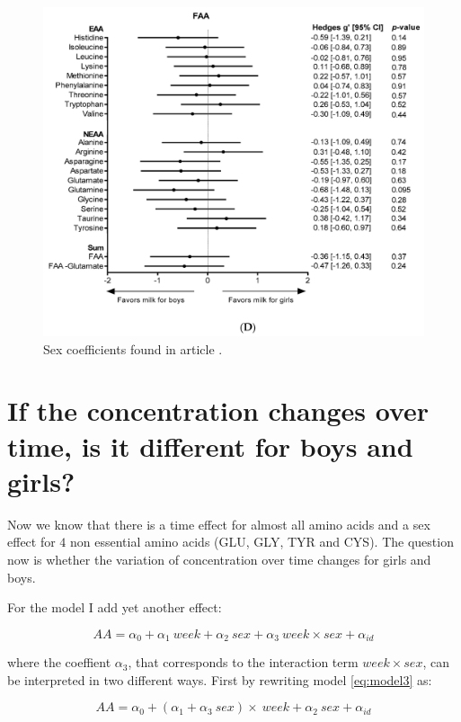 \documentclass[12pt]{article}
\begin{document}
\begin{figure}[!htb]
  \includegraphics[width= \textwidth]{../sex/nutrientsFAA.png}
  \caption{Sex coefficients found in article \cite{NutrientsDutch}.}
  \label{fig:nutrientsFAA}
\end{figure}

\section{If the concentration changes over time, is it different for boys and girls?}

Now we know that there is a time effect for almost all amino acids and a sex effect for $4$ non essential amino acids (GLU, GLY, TYR and CYS). The question now is whether the variation of concentration over time changes for girls and boys.

For the model I add yet another effect:

\begin{equation} \label{eq:model3}
  AA = \alpha_0 + \alpha_1 \ week + \alpha_2 \ sex + \alpha_3 \ week \times sex + \alpha_{id}
\end{equation}

where the coeffient $\alpha_3$, that corresponds to the interaction term $week \times sex$, can be interpreted in two different ways. First by rewriting model \ref{eq:model3} as:

\begin{equation} \label{eq:model3a}
  AA = \alpha_0 + \left(\alpha_1  + \alpha_3 \ sex \right) \times \ week + \alpha_2 \ sex  + \alpha_{id}
\end{equation}
\end{document}
